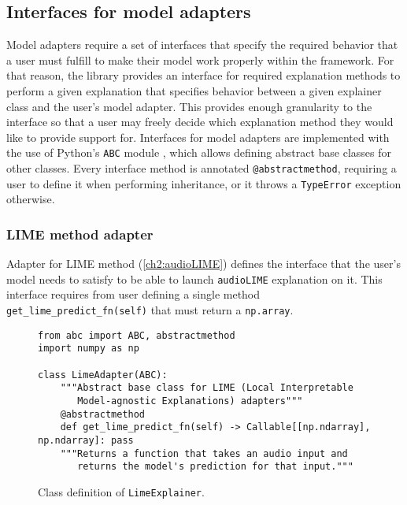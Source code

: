 \documentclass[
    bindingoffset=5mm,  %
    footnoteindent=3mm, %
    hyphenation=true    %
]{src/wut-thesis}
\begin{document}
\subsection{Interfaces for model adapters} \label{ch5:AdapterInterfaces}

    Model adapters require a set of interfaces that specify the required behavior that a user
    must fulfill to make their model work properly within the framework. For that reason, the 
    library provides an interface for required explanation methods to perform a given 
    explanation that specifies behavior
    between a given explainer class and the user’s model adapter. This provides enough 
    granularity to the interface so that a user may freely decide which explanation method 
    they would like to provide support for.
    Interfaces for model adapters are implemented with the use of
    Python’s \texttt{ABC} module \cite{pythonABC}, which allows defining abstract 
    base classes for other classes. Every interface method is annotated 
    \texttt{@abstractmethod}, requiring a user to define it when performing inheritance, or it throws a \texttt{TypeError} exception otherwise.
    
\subsubsection{LIME method adapter}

    Adapter for LIME method (\ref{ch2:audioLIME}) defines the interface that the user's model needs to satisfy to be able to launch \texttt{audioLIME} explanation on it.
    This interface requires from user defining a single method \texttt{get_lime_predict_fn(self)}
    that must return a \texttt{np.array}.

\begin{figure}%
\begin{verbatim}
from abc import ABC, abstractmethod
import numpy as np

class LimeAdapter(ABC):
    """Abstract base class for LIME (Local Interpretable
       Model-agnostic Explanations) adapters"""
    @abstractmethod
    def get_lime_predict_fn(self) -> Callable[[np.ndarray], np.ndarray]: pass
    """Returns a function that takes an audio input and
       returns the model's prediction for that input."""
\end{verbatim}
\caption{Class definition of \texttt{LimeExplainer}.}
\label{fig:LimeAdapter}
\end{figure}
\end{document}

